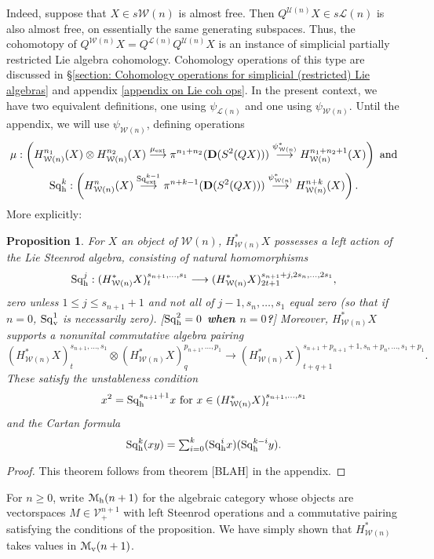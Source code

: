 \documentclass[11pt]{amsart}
\theoremstyle{plain}
\newtheorem{prop}[thm]{Proposition}
\theoremstyle{definition}
\renewcommand{\to}{\longrightarrow}
\newcommand{\calW}{\mathcal{W}}
\newcommand{\calU}{\mathcal{U}}
\newcommand{\calL}{\mathcal{L}}
\newcommand{\calV}{\mathcal{V}}
\newcommand{\calMv}{\mathcal{M}_\textup{v}}
\newcommand{\calMh}{\mathcal{M}_\textup{h}}
\theoremstyle{plain}
\newcommand{\vect}[2]{\calV^{#1}_{#2}}
\newcommand{\ExtCohOp}{\textup{Sq}_\textup{ext}}
\newcommand{\ExtCohProd}{\mu_\textup{ext}}
\newcommand{\Sqh}{\mathrm{Sq}_\textup{h}}
\newcommand{\Sqv}{\mathrm{Sq}_\textup{v}}
\newcommand{\dual}{\mathbf{D}}
\begin{document}
\begin{Cohomology Operations for W and U}
Indeed, suppose that $X\in s\calW(n)$ is almost free. Then $Q^{\calU(n)}X\in s\calL(n)$ is also almost free, on essentially the same generating subspaces. Thus, the cohomotopy of $Q^{\calW(n)}X=Q^{\calL(n)}Q^{\calU(n)}X$ is an instance of simplicial partially restricted Lie algebra cohomology. Cohomology operations of this type are discussed in \S\ref{section: Cohomology operations for simplicial (restricted) Lie algebras} and appendix \ref{appendix on Lie coh ops}. In the present context, we have two equivalent definitions, one using $\psi_{\calL(n)}$ and one using $\psi_{\calW(n)}$. Until the appendix, we will use $\psi_{\calW(n)}$, defining operations
\begin{gather*}
\mu:\left(H_{\calW(n)}^{n_1}(X)\otimes H_{\calW(n)}^{n_2}(X)\overset{\ExtCohProd}{\to} \pi^{n_1+n_2}(\dual(S^2(QX)))\overset{\psi_{\calW(n)}^*}{\to} H_{\calW(n)}^{n_1+n_2+1}(X)\right)\textup{ and}\\
\Sqh^k:\left(H_{\calW(n)}^{n}(X)\overset{\ExtCohOp^{k-1}}{\to} \pi^{n+k-1}(\dual(S^2(QX)))\overset{\psi_{\calW(n)}^*}{\to} H_{\calW(n)}^{n+k}(X)\right).
\end{gather*}
More explicitly:
\begin{prop}
For $X$ an object of $\calW(n)$, $H^*_{\calW(n)}X$ possesses a left action of the Lie Steenrod algebra, consisting of natural homomorphisms
\[\Sqh^j:(H^*_{\calW(n)}X)_t^{s_{n+1},\ldots,s_1}\to (H^*_{\calW(n)}X)_{2t+1}^{s_{n+1}+j,2s_{n},\ldots,2s_1},\]
zero unless $1\leq j\leq s_{n+1}+1$ and not all of $j-1,s_{n},\ldots,s_1$ equal zero (so that if $n=0$, $\Sqv^1$ is necessarily zero). %
[\textbf{$\Sqh^2=0$ when $n=0$?}] Moreover, $H^*_{\calW(n)}X$ supports a nonunital commutative algebra pairing
\[(H^*_{\calW(n)}X)_t^{s_{n+1},\ldots,s_1}\otimes (H^*_{\calW(n)}X)_q^{p_{n+1},\ldots,p_1}\to (H^*_{\calW(n)}X)_{t+q+1}^{s_{n+1}+p_{n+1}+1,s_{n}+p_{n},\ldots,s_1+p_1}.\]
These satisfy the unstableness condition
\[x^2=\Sqh^{s_{n+1}+1}x\text{ for }x\in (H^*_{\calW(n)}X)_t^{s_{n+1},\ldots,s_1}\]
and the Cartan formula
\[\Sqh^k(xy)=\textstyle\sum_{i=0}^k(\Sqh^ix)(\Sqh^{k-i}y).\]
\end{prop}
\begin{proof}
This theorem follows from theorem [BLAH] in the appendix.
\end{proof}
For $n\geq0$, write $\calMh(n+1)$ for the algebraic category whose objects are vectorspaces $M\in\vect{n+1}{+}$ with left Steenrod operations and a commutative pairing satisfying the conditions of the proposition. We have simply shown that $H^*_{\calW(n)}$ takes values in $\calMv(n+1)$.


\end{Cohomology Operations for W and U}
\end{document}
